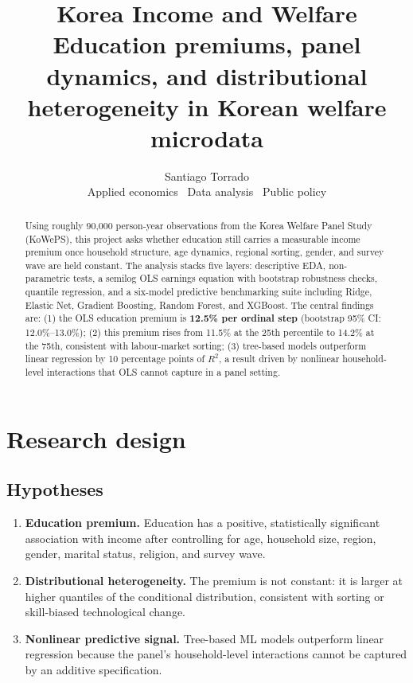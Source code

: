 \documentclass[11pt,a4paper]{article}
\title{\textbf{Korea Income and Welfare}\\[0.35em]
\large Education premiums, panel dynamics, and distributional\\
heterogeneity in Korean welfare microdata}
\author{Santiago Torrado \\ \small Applied economics \textbar\ Data analysis \textbar\ Public policy}
\date{}
\begin{document}
\maketitle
\vspace{-0.5em}

\begin{abstract}
\noindent
Using roughly 90{,}000 person-year observations from the Korea Welfare Panel
Study (KoWePS), this project asks whether education still carries a
measurable income premium once household structure, age dynamics, regional
sorting, gender, and survey wave are held constant. The analysis stacks
five layers: descriptive EDA, non-parametric tests, a semilog OLS earnings
equation with bootstrap robustness checks, quantile regression, and a
six-model predictive benchmarking suite including Ridge, Elastic Net,
Gradient Boosting, Random Forest, and XGBoost. The central findings are:
(1) the OLS education premium is \textbf{12.5\% per ordinal step}
(bootstrap 95\% CI: 12.0\%–13.0\%); (2) this premium rises from 11.5\%
at the 25th percentile to 14.2\% at the 75th, consistent with
labour-market sorting; (3) tree-based models outperform linear regression
by 10 percentage points of $R^2$, a result driven by nonlinear
household-level interactions that OLS cannot capture in a panel setting.
\end{abstract}

\section{Research design}

\subsection{Hypotheses}

\begin{enumerate}[leftmargin=1.8em, label=\textbf{H\arabic*.}, itemsep=2pt]
  \item \textbf{Education premium.} Education has a positive, statistically
        significant association with income after controlling for age,
        household size, region, gender, marital status, religion, and
        survey wave.
  \item \textbf{Distributional heterogeneity.} The premium is not constant:
        it is larger at higher quantiles of the conditional distribution,
        consistent with sorting or skill-biased technological change.
  \item \textbf{Nonlinear predictive signal.} Tree-based ML models
        outperform linear regression because the panel's household-level
        interactions cannot be captured by an additive specification.
\end{enumerate}
\end{document}
